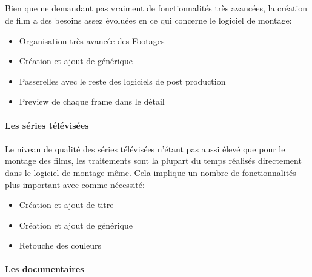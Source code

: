 \subparagraph{}

Bien que ne demandant pas vraiment de fonctionnalités très avancées, la création
de film a des besoins assez évoluées en ce qui concerne le logiciel de montage:
\begin{itemize} \setlength{\itemsep}{2mm}
  \item{Organisation très avancée des Footages}
  \item{Création et ajout de générique}
  \item{Passerelles avec le reste des logiciels de post production}
  \item{Preview de chaque frame dans le détail}
\end{itemize}


\paragraph {Les séries télévisées}

\paragraph{}

Le niveau de qualité des séries télévisées n'étant pas aussi élevé que pour
le montage des films, les traitements sont la plupart du temps réalisés
directement dans le logiciel de montage même. Cela implique un nombre de
fonctionnalités plus important avec comme nécessité:
\begin{itemize} \setlength{\itemsep}{2mm}
  \item{Création et ajout de titre}
  \item{Création et ajout de générique}
  \item{Retouche des couleurs}
\end{itemize}

\paragraph {Les documentaires}

